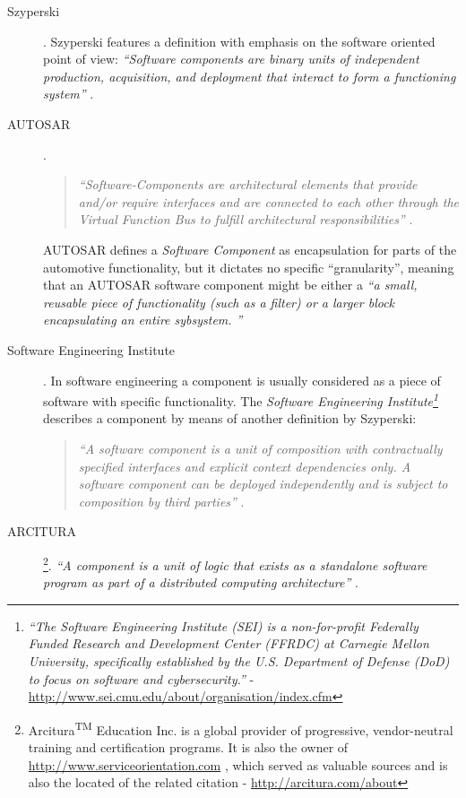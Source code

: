 \begin{description}
	\item [Szyperski].
	Szyperski features a definition with emphasis on the software oriented point of view: \emph{``Software components are binary units of independent production, acquisition, and deployment that interact to form a functioning system''} \cite[p.xxi]{szyperski}.

	\item [AUTOSAR].
	\begin{quote}
	\emph{``Software-Components are architectural elements that provide and/or require interfaces and are connected to each other through the Virtual Function Bus to fulfill architectural responsibilities''} \cite{autosar_glossary}.
	\end{quote}

	AUTOSAR defines a \emph{Software Component} as encapsulation for parts of the automotive functionality, but it dictates no specific ``granularity'', meaning that an AUTOSAR software component might be either a \emph{``a small, reusable piece of functionality (such as a filter) or a larger block encapsulating an entire sybsystem. \cite{autosar}''}
	
	\item [Software Engineering Institute].
	In software engineering a component is usually considered as a piece of software with specific functionality. The \emph{Software Engineering Institute\footnote{\emph{``The Software Engineering Institute (SEI) is a non-for-profit Federally Funded Research and Development Center (FFRDC) at Carnegie Mellon University, specifically established by the U.S. Department of Defense (DoD) to focus on software and cybersecurity.''} - \url{http://www.sei.cmu.edu/about/organisation/index.cfm}}} describes a component by means of another definition by Szyperski:
	\begin{quote}
	\emph{``A software component is a unit of composition with contractually specified interfaces and explicit context dependencies only. A software component can be deployed independently and is subject to composition by third parties''} \cite{szyperski}.
	\end{quote}

	\item [ARCITURA]\footnote{Arcitura\textsuperscript{TM} Education Inc. is a global provider of progressive, vendor-neutral training and certification programs. It is also the owner of \url{http://www.serviceorientation.com} \cite{arcitura}, which served as valuable sources and is also the located of the related citation - \url{http://arcitura.com/about}}.
	\emph{``A component is a unit of logic that exists as a standalone software program as part of a distributed computing architecture''} \cite{arcitura}.
 \end{description}


